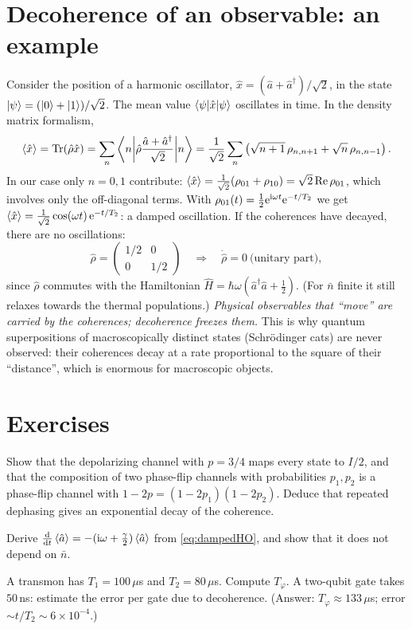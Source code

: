 \section{Decoherence of an observable: an example}
Consider the position of a harmonic oscillator, $\hat x=(\hat a+\hat a^\dagger)/\sqrt2$, in the state $\left|\psi\right\rangle=(\left|0\right\rangle+\left|1\right\rangle)/\sqrt2$. The mean value $\left\langle\psi\middle|\hat x\middle|\psi\right\rangle$
oscillates in time. In the density matrix formalism,
\begin{equation}
  \left\langle\hat x\right\rangle=\operatorname{Tr}(\hat\rho\hat x)=\sum_n\left\langle n\middle|\hat\rho\frac{\hat a+\hat a^\dagger}{\sqrt2}\middle|n\right\rangle
  =\frac1{\sqrt2}\sum_n\left(\sqrt{n+1}\,\rho_{n,n+1}+\sqrt n\,\rho_{n,n-1}\right).
\end{equation}
In our case only $n=0,1$ contribute: $\left\langle\hat x\right\rangle=\frac1{\sqrt2}(\rho_{01}+\rho_{10})=\sqrt2\operatorname{Re}\rho_{01}$, which involves only the off-diagonal terms. With
$\rho_{01}(t)=\frac12\mathrm e^{\mathrm i\omega t}\mathrm e^{-t/T_2}$ we get $\left\langle\hat x\right\rangle=\frac1{\sqrt2}\cos(\omega t)\,\mathrm e^{-t/T_2}$: a damped oscillation. If the coherences have decayed, there are no
oscillations:
\begin{equation}
  \hat\rho=\begin{pmatrix}1/2&0\\0&1/2\end{pmatrix}\quad\Longrightarrow\quad\dot{\hat\rho}=0\ \text{(unitary part)},
\end{equation}
since $\hat\rho$ commutes with the Hamiltonian $\hat H=\hbar\omega(\hat a^\dagger\hat a+\frac12)$. (For $\bar n$ finite it still relaxes towards the thermal populations.)
\emph{Physical observables that ``move'' are carried by the coherences; decoherence freezes them.} This is why quantum superpositions of macroscopically distinct states
(Schrödinger cats) are never observed: their coherences decay at a rate proportional to the square of their ``distance'', which is enormous for macroscopic objects.

\section{Exercises}
\begin{exercise}
Show that the depolarizing channel with $p=3/4$ maps every state to $I/2$, and that the composition of two phase-flip channels with probabilities $p_1,p_2$ is a phase-flip
channel with $1-2p=(1-2p_1)(1-2p_2)$. Deduce that repeated dephasing gives an exponential decay of the coherence.
\end{exercise}
\begin{exercise}
Derive $\frac{\mathrm d}{\mathrm d t}\left\langle\hat a\right\rangle=-(\mathrm i\omega+\frac\gamma2)\left\langle\hat a\right\rangle$ from \cref{eq:dampedHO}, and show that it does not depend on $\bar n$.
\end{exercise}
\begin{exercise}
A transmon has $T_1=100\,\mu$s and $T_2=80\,\mu$s. Compute $T_\varphi$. A two-qubit gate takes $50$\,ns: estimate the error per gate due to decoherence.
(Answer: $T_\varphi\approx133\,\mu$s; error $\sim t/T_2\sim6\times10^{-4}$.)
\end{exercise}
